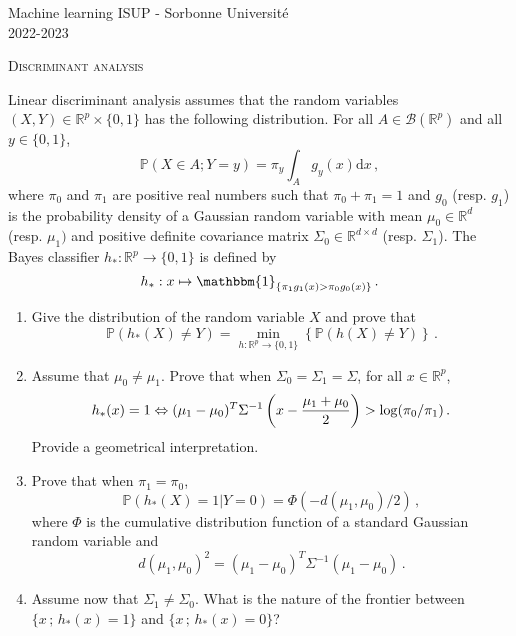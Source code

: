 \documentclass[a4paper,10pt,fleqn]{article}
\newcommand{\eqsp}{\,}
\newcommand{\calF}{\mathcal{F}}
\newcommand{\rmd}{\mathrm{d}}
\newcommand{\rset}{\ensuremath{\mathbb{R}}}
\newcommand{\bP}{\mathbb{P}}
\newcommand{\1}{\ensuremath{\mathbbm{1}}}
\begin{document}
\noindent Machine learning \hfill ISUP - Sorbonne Universit\'e \\
 2022-2023

\noindent\hrulefill

\begin{center}
\textsc{Discriminant analysis}
\end{center}
\hrulefill

\medskip

Linear discriminant analysis assumes that the random variables $(X,Y)\in \rset^p\times\{0,1\}$ has the following distribution. For all $A\in \mathcal{B}(\mathbb{R}^p)$ and all $y\in\{0,1\}$,
$$
\bP\left(X\in A;Y=y\right) = \pi_y \int_A g_y(x) \rmd x\eqsp,
$$
where $\pi_{0}$ and $\pi_1$ are positive real numbers such that $\pi_0+\pi_{1}=1$ and $g_0$ (resp. $g_1$) is the probability density of a Gaussian random variable with mean $\mu_0\in\rset^d$ (resp. $\mu_1)$ and positive definite covariance matrix $\Sigma_0\in \rset^{d\times d}$ (resp. $\Sigma_1$).  The Bayes classifier $h_{*}:\mathbb{R}^p\to\{0,1\}$ is defined by
$$
h_{*}:x \mapsto \1_{\{\pi_{1}g_{1}(x)>\pi_{0}g_{0}(x)\}}\eqsp.
$$
\begin{enumerate}
\item Give the distribution of the random variable $X$ and prove that 
$$
\bP(h_{*}(X)\neq Y)=\min_{h:\rset^p\to \{0,1\}}\left\{\bP(h(X)\neq Y)\right\}\eqsp.
$$
\item Assume that  $\mu_0\ne\mu_1$. Prove that when $\Sigma_0=\Sigma_1=\Sigma$, for all $x\in\rset^p$,
$$
h_{*}(x) = 1 \Leftrightarrow (\mu_{1}-\mu_{0})^T\Sigma^{-1}\left(x-{\mu_{1}+\mu_{0}\over2}\right)>\log(\pi_{0}/\pi_{1})\eqsp.
$$
Provide a geometrical interpretation.
\item Prove that when $\pi_{1}=\pi_{0}$, 
$$
\bP(h_{*}(X)=1|Y=0)=\Phi(-d(\mu_{1},\mu_{0})/2)\eqsp,
$$
where $\Phi$ is the cumulative distribution function of a standard Gaussian random variable  and 
$$
d(\mu_{1},\mu_{0})^2=(\mu_{1}-\mu_{0})^T\Sigma^{-1}(\mu_{1}-\mu_{0})\eqsp.
$$
\item Assume now that $\Sigma_{1}\neq \Sigma_{0}$. What is the nature of the frontier between $\{x\eqsp;\eqsp h_{*}(x)=1\}$ and $\{x\eqsp;\eqsp h_{*}(x)=0\}$?
\end{enumerate}
%
\end{document}
